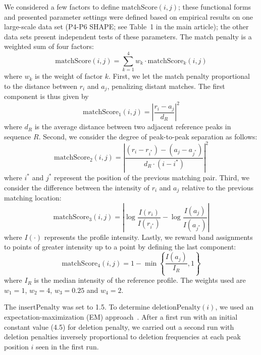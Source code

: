 \documentclass[letter]{bioinfo}
\begin{document}
We considered a few factors to define $\mathrm{matchScore}(i,j)$; these functional forms and presented parameter settings were defined based on empirical results on one large-scale data set (P4-P6 SHAPE; see Table~1 in the main article); the other data sets present independent tests of these parameters. The match penalty is a weighted sum of four factors:
\begin{equation}
\mathrm{matchScore}(i,j) = \sum_{k=1}^4 w_k\cdot\mathrm{matchScore}_k(i,j)
\end{equation}
where $w_k$ is the weight of factor $k$. First, we let the match penalty proportional to the distance between $r_i$ and $a_j$, penalizing distant matches. The first component is thus given by
\begin{equation}
\mathrm{matchScore}_1(i,j) =\left|\frac{r_i-a_j}{d_R} \right|^2
\end{equation}
%
where $d_R$ is the average distance between two adjacent reference peaks in sequence $R$.
%
Second, we consider the degree of peak-to-peak separation as follows:
\begin{equation}
\mathrm{matchScore}_2(i,j)=\left|\frac{ (r_i-r_{i^*})-(a_j-a_{j^*})}{d_R\cdot(i-i^*)}\right|^2
\end{equation}
where $i^*$ and $j^*$ represent the position of the previous matching pair.
%
Third, we consider the difference between the intensity of $r_i$ and $a_j$ relative to the previous matching location:
\begin{equation}
\mathrm{matchScore}_3(i,j) = \left | \log\frac{I(r_i)}{I(r_{i^*})} - \log\frac{I(a_j)}{I(a_{j^*})} \right |
\end{equation}
where $I(\cdot)$ represents the profile intensity.
%
Lastly, we reward band assignments to points of greater intensity up to a point by defining the last component:
\begin{equation}
\mathrm{matchScore}_4(i,j) = 1 - \min \left\{ \frac{I(a_j)}{I_R}, 1 \right\}
\end{equation}
where $I_R$ is the median intensity of the reference profile. The weights used are $w_1=1$, $w_2=4$, $w_3=0.25$ and $w_4=2$.

The $\mathrm{insertPenalty}$ was set to 1.5. To determine $\mathrm{deletionPenalty}(i)$, we used an expectation-maximization (EM) approach~\citep{bishop06}. After a first run with an initial constant value (4.5) for deletion penalty, we carried out a second run with deletion penalties inversely proportional to deletion frequencies at each peak position $i$ seen in the first run.
\end{document}
